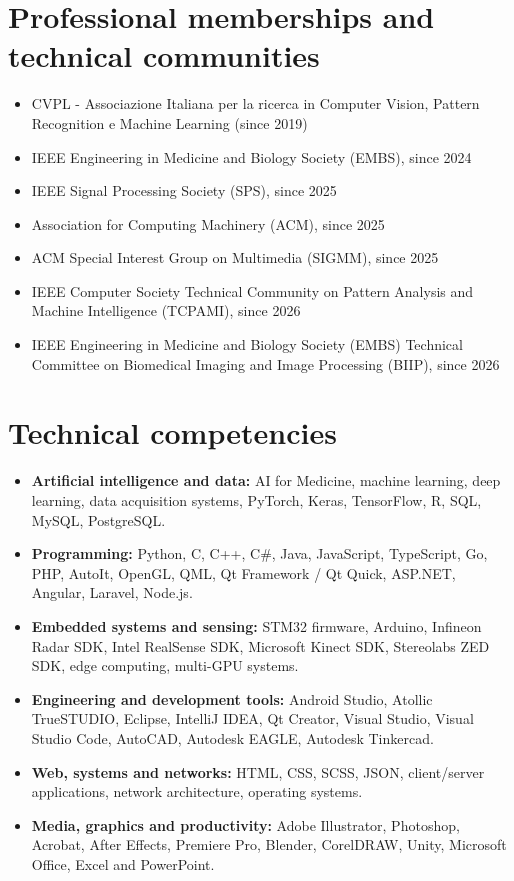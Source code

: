 \documentclass[10pt,a4paper]{article}
\begin{document}
\section{Professional memberships and technical communities}
\begin{itemize}
\item CVPL - Associazione Italiana per la ricerca in Computer Vision, Pattern Recognition e Machine Learning (since 2019)
\item IEEE Engineering in Medicine and Biology Society (EMBS), since 2024
\item IEEE Signal Processing Society (SPS), since 2025
\item Association for Computing Machinery (ACM), since 2025
\item ACM Special Interest Group on Multimedia (SIGMM), since 2025
\item IEEE Computer Society Technical Community on Pattern Analysis and Machine Intelligence (TCPAMI), since 2026
\item IEEE Engineering in Medicine and Biology Society (EMBS) Technical Committee on Biomedical Imaging and Image Processing (BIIP), since 2026
\end{itemize}

\section{Technical competencies}
\begin{itemize}
\item \textbf{Artificial intelligence and data:} AI for Medicine, machine learning, deep learning, data acquisition systems, PyTorch, Keras, TensorFlow, R, SQL, MySQL, PostgreSQL.
\item \textbf{Programming:} Python, C, C++, C\#, Java, JavaScript, TypeScript, Go, PHP, AutoIt, OpenGL, QML, Qt Framework / Qt Quick, ASP.NET, Angular, Laravel, Node.js.
\item \textbf{Embedded systems and sensing:} STM32 firmware, Arduino, Infineon Radar SDK, Intel RealSense SDK, Microsoft Kinect SDK, Stereolabs ZED SDK, edge computing, multi-GPU systems.
\item \textbf{Engineering and development tools:} Android Studio, Atollic TrueSTUDIO, Eclipse, IntelliJ IDEA, Qt Creator, Visual Studio, Visual Studio Code, AutoCAD, Autodesk EAGLE, Autodesk Tinkercad.
\item \textbf{Web, systems and networks:} HTML, CSS, SCSS, JSON, client/server applications, network architecture, operating systems.
\item \textbf{Media, graphics and productivity:} Adobe Illustrator, Photoshop, Acrobat, After Effects, Premiere Pro, Blender, CorelDRAW, Unity, Microsoft Office, Excel and PowerPoint.
\end{itemize}
\end{document}

